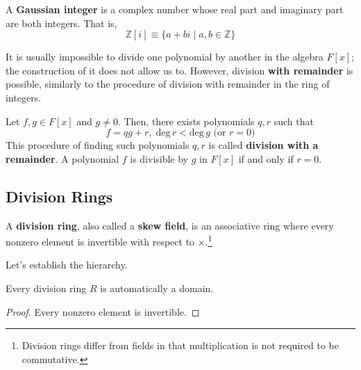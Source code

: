   \begin{definition}
    A \textbf{Gaussian integer} is a complex number whose real part and imaginary part are both integers. That is, 
    \begin{equation}
      \mathbb{Z}[i] \equiv \{a + b i \;|\; a, b \in \mathbb{Z} \}
    \end{equation}
  \end{definition}

  It is usually impossible to divide one polynomial by another in the algebra $F[x]$; the construction of it does not allow us to. However, division \textbf{with remainder} is possible, similarly to the procedure of division with remainder in the ring of integers. 

  \begin{theorem}
    Let $f, g \in F[x]$ and $g \neq 0$. Then, there exists polynomials $q, r$ such that 
    \begin{equation}
      f = q g + r, \; \text{deg}\, r < \text{deg}\, g \text{ (or } r = 0 \text{)}
    \end{equation}
    This procedure of finding such polynomials $q, r$ is called \textbf{division with a remainder}. A polynomial $f$ is divisible by $g$ in $F[x]$ if and only if $r = 0$. 
  \end{theorem}

  \begin{theorem}
    
  \end{theorem}

\subsection{Division Rings}

  \begin{definition}
    A \textbf{division ring}, also called a \textbf{skew field}, is an associative ring where every nonzero element is invertible with respect to $\times$.\footnote{Division rings differ from fields in that multiplication is not required to be commutative. }
  \end{definition}

  Let's establish the hierarchy. 

  \begin{lemma}
    Every division ring $R$ is automatically a domain. 
  \end{lemma}
  \begin{proof}
    Every nonzero element is invertible. 
  \end{proof}

